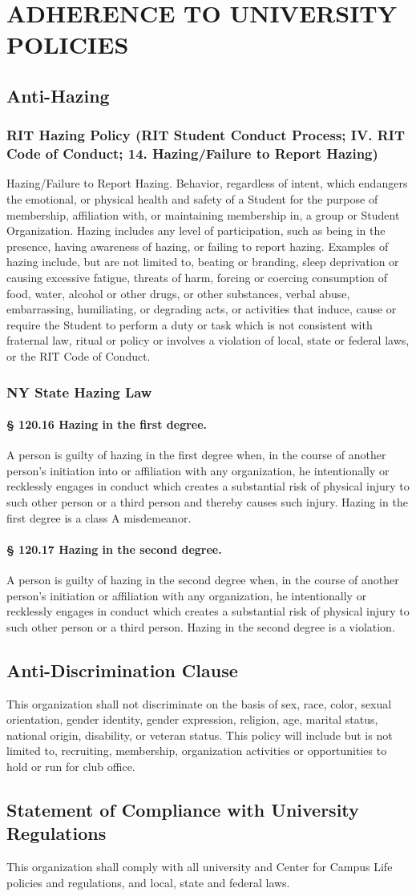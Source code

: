 \documentclass{article}
\newcommand{\article}[1]{\section{#1} \label{#1}}
\newcommand{\asection}[1]{\subsection{#1} \label{#1}}
\newcommand{\asubsection}[1]{\subsubsection{#1} \label{#1}}
\newcommand{\asubsubsection}[1]{\paragraph{#1} \label{#1}}
\begin{document}
\article{ADHERENCE TO UNIVERSITY POLICIES}

\asection{Anti-Hazing}

\asubsection{RIT Hazing Policy (RIT Student Conduct Process; IV. RIT Code of Conduct; 14. Hazing/Failure to Report Hazing)}
Hazing/Failure to Report Hazing.
Behavior, regardless of intent, which endangers the emotional, or physical health and safety of a Student for the purpose of membership, affiliation with, or maintaining membership in, a group or Student Organization.
Hazing includes any level of participation, such as being in the presence, having awareness of hazing, or failing to report hazing.
Examples of hazing include, but are not limited to, beating or branding, sleep deprivation or causing excessive fatigue, threats of harm, forcing or coercing consumption of food, water, alcohol or other drugs, or other substances, verbal abuse, embarrassing, humiliating, or degrading acts, or activities that induce, cause or require the Student to perform a duty or task which is not consistent with fraternal law, ritual or policy or involves a violation of local, state or federal laws, or the RIT Code of Conduct.

\asubsection{NY State Hazing Law}

\asubsubsection{§ 120.16 Hazing in the first degree.}
A person is guilty of hazing in the first degree when, in the course of another person's initiation into or affiliation with any organization, he intentionally or recklessly engages in conduct which creates a substantial risk of physical injury to such other person or a third person and thereby causes such injury.
Hazing in the first degree is a class A misdemeanor.

\asubsubsection{§ 120.17 Hazing in the second degree.}
A person is guilty of hazing in the second degree when, in the course of another person's initiation or affiliation with any organization, he intentionally or recklessly engages in conduct which creates a substantial risk of physical injury to such other person or a third person.
Hazing in the second degree is a violation.

\asection{Anti-Discrimination Clause}
This organization shall not discriminate on the basis of sex, race, color, sexual orientation, gender identity, gender expression, religion, age, marital status, national origin, disability, or veteran status.
This policy will include but is not limited to, recruiting, membership, organization activities or opportunities to hold or run for club office.

\asection{Statement of Compliance with University Regulations}
This organization shall comply with all university and Center for Campus Life policies and regulations, and local, state and federal laws.
\end{document}
